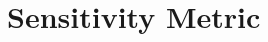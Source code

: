 \documentclass[%
 amsmath,amssymb,
aps,
]{revtex4-2}
\begin{document}


\section{Sensitivity Metric}
\end{document}
